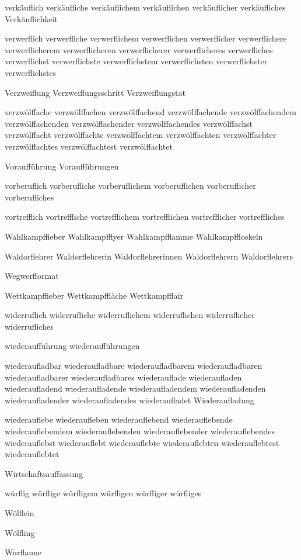 verkäuflich verkäufliche verkäuflichem verkäuflichen verkäuflicher verkäufliches Verkäuflichkeit

verwerflich verwerfliche verwerflichem verwerflichen verwerflicher verwerflichere verwerflicherem verwerflicheren verwerflicherer verwerflicheres verwerfliches verwerflichst verwerflichste verwerflichstem verwerflichsten verwerflichster verwerflichstes

Verzweiflung Verzweiflungsschritt Verzweiflungstat

verzwölffache verzwölffachen verzwölffachend verzwölffachende verzwölffachendem verzwölffachenden verzwölffachender verzwölffachendes verzwölffachst verzwölffacht verzwölffachte verzwölffachtem verzwölffachten verzwölffachter verzwölffachtes verzwölffachtest verzwölffachtet

Voraufführung Voraufführungen

vorberuflich vorberufliche vorberuflichem vorberuflichen vorberuflicher vorberufliches

vortrefflich vortreffliche vortrefflichem vortrefflichen vortrefflicher vortreffliches

Wahlkampffieber Wahlkampfflyer Wahlkampfflamme Wahlkampffloskeln 

Waldorflehrer Waldorflehrerin Waldorflehrerinnen Waldorflehrern Waldorflehrers

Wegwerfformat

Wettkampffieber Wettkampffläche Wettkampfflair 

widerruflich widerrufliche widerruflichem widerruflichen widerruflicher widerrufliches

wiederaufführung wiederaufführungen

wiederaufladbar wiederaufladbare wiederaufladbarem wiederaufladbaren wiederaufladbarer wiederaufladbares wiederauflade wiederaufladen wiederaufladend wiederaufladende wiederaufladendem wiederaufladenden wiederaufladender wiederaufladendes wiederaufladet Wiederaufladung

wiederauflebe wiederaufleben wiederauflebend wiederauflebende wiederauflebendem wiederauflebenden wiederauflebender wiederauflebendes wiederauflebst wiederauflebt wiederauflebte wiederauflebten wiederauflebtest wiederauflebtet

Wirtschaftsauffassung


würflig würflige würfligem würfligen würfliger würfliges

Wölflein

Wölfling

Wurflaune

